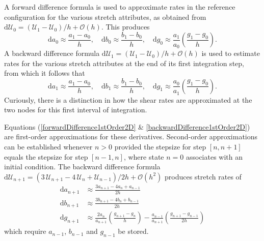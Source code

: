 A forward difference formula is used to approximate rates in the reference configuration for the various stretch attributes, as obtained from $\mathrm{d} \boldsymbol{\mathcal{U}}_0 = ( \boldsymbol{\mathcal{U}}_1 -  \boldsymbol{\mathcal{U}}_0 ) / h + \mathcal{O}(h)$.  This produces
\begin{equation}
\mathrm{d} a_0 \approx \frac {a_1 - a_0}{h} , \quad 
\mathrm{d} b_0 \approx \frac {b_1 - b_0}{h} , \quad 
\mathrm{d} g_0 \approx \frac{a_1}{a_0} 
\left( \frac{g_1 - g_0}{h} \right) .
\label{forwardDifference1stOrder2D}
\end{equation}
A backward difference formula $\mathrm{d} \boldsymbol{\mathcal{U}}_1 = ( \boldsymbol{\mathcal{U}}_1 -  \boldsymbol{\mathcal{U}}_0 ) / h + \mathcal{O}(h)$ is used to estimate rates for the various stretch attributes at the end of its first integration step, from which it follows that
\begin{equation}
\mathrm{d} a_1 \approx \frac {a_1 - a_0}{h} , \quad
\mathrm{d} b_1 \approx \frac {b_1 - b_0}{h} , \quad
\mathrm{d} g_1 \approx \frac{a_0}{a_1} 
\left(\frac{g_1 - g_0}{h} \right) .
\label{backwardDifference1stOrder2D}
\end{equation}
Curiously, there is a distinction in how the shear rates are approximated at the two nodes for this first interval of integration.

Equations (\ref{forwardDifference1stOrder2D} \& \ref{backwardDifference1stOrder2D}) are first-order approximations for these derivatives.  Second-order approximations can be established whenever $n > 0$ provided the stepsize for step $[n, n+1]$ equals the stepsize for step $[n-1, n]$, where state $n=0$ associates with an initial condition.  The backward difference formula  $\mathrm{d} \boldsymbol{\mathcal{U}}_{n+1} = ( 3 \, \boldsymbol{\mathcal{U}}_{n+1} -  4 \, \boldsymbol{\mathcal{U}}_{n} + \boldsymbol{\mathcal{U}}_{n-1} ) / 2h + \mathcal{O}(h^2)$ produces stretch rates of
\begin{equation}
\begin{aligned}
\mathrm{d} a_{n+1} & 
\approx \frac {3a_{n+1} - 4a_{n} +  a_{n-1}}{2h} \\ 
\mathrm{d} b_{n+1} & 
\approx \frac {3b_{n+1} - 4b_{n} +  b_{n-1}}{2h} \\
\mathrm{d} g_{n+1} & 
\approx \frac{2a_{n}} {a_{n+1}} \left(\frac{g_{n+1} - g_{n}}{h} \right) - \frac{a_{n-1}}{a_{n+1}} \left( \frac{g_{n+1} - g_{n-1}}{2h} \right) 
\end{aligned}
\label{backwardDifference2ndOrder2D}
\end{equation}
which require $a_{n-1}$, $b_{n-1}$ and $g_{n-1}$ be stored.

